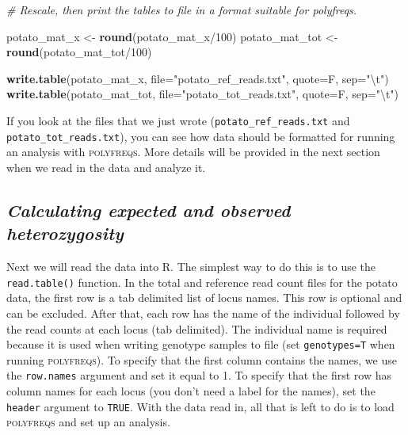 \documentclass[]{article}
\newenvironment{Shaded}{\begin{snugshade}}{\end{snugshade}}
\newcommand{\KeywordTok}[1]{\textcolor[rgb]{0.13,0.29,0.53}{\textbf{{#1}}}}
\newcommand{\DataTypeTok}[1]{\textcolor[rgb]{0.13,0.29,0.53}{{#1}}}
\newcommand{\DecValTok}[1]{\textcolor[rgb]{0.00,0.00,0.81}{{#1}}}
\newcommand{\CharTok}[1]{\textcolor[rgb]{0.31,0.60,0.02}{{#1}}}
\newcommand{\StringTok}[1]{\textcolor[rgb]{0.31,0.60,0.02}{{#1}}}
\newcommand{\CommentTok}[1]{\textcolor[rgb]{0.56,0.35,0.01}{\textit{{#1}}}}
\newcommand{\NormalTok}[1]{{#1}}
\begin{document}
\begin{Shaded}
\begin{Highlighting}[]
\CommentTok{# Rescale, then print the tables to file in a format suitable for polyfreqs.}

\NormalTok{potato_mat_x <-}\StringTok{ }\KeywordTok{round}\NormalTok{(potato_mat_x/}\DecValTok{100}\NormalTok{)}
\NormalTok{potato_mat_tot <-}\StringTok{ }\KeywordTok{round}\NormalTok{(potato_mat_tot/}\DecValTok{100}\NormalTok{)}

\KeywordTok{write.table}\NormalTok{(potato_mat_x, }\DataTypeTok{file=}\StringTok{"potato_ref_reads.txt"}\NormalTok{, }\DataTypeTok{quote=}\NormalTok{F, }\DataTypeTok{sep=}\StringTok{"}\CharTok{\textbackslash{}t}\StringTok{"}\NormalTok{)}
\KeywordTok{write.table}\NormalTok{(potato_mat_tot, }\DataTypeTok{file=}\StringTok{"potato_tot_reads.txt"}\NormalTok{, }\DataTypeTok{quote=}\NormalTok{F, }\DataTypeTok{sep=}\StringTok{"}\CharTok{\textbackslash{}t}\StringTok{"}\NormalTok{)}
\end{Highlighting}
\end{Shaded}

If you look at the files that we just wrote
(\texttt{potato\_ref\_reads.txt} and \texttt{potato\_tot\_reads.txt}),
you can see how data should be formatted for running an analysis with
\textsc{polyfreqs}. More details will be provided in the next section
when we read in the data and analyze it.

\subsection{\texorpdfstring{\emph{Calculating expected and observed
heterozygosity}}{Calculating expected and observed heterozygosity}}\label{calculating-expected-and-observed-heterozygosity}

Next we will read the data into R. The simplest way to do this is to use
the \texttt{read.table()} function. In the total and reference read
count files for the potato data, the first row is a tab delimited list
of locus names. This row is optional and can be excluded. After that,
each row has the name of the individual followed by the read counts at
each locus (tab delimited). The individual name is required because it
is used when writing genotype samples to file (set \texttt{genotypes=T}
when running \textsc{polyfreqs}). To specify that the first column
contains the names, we use the \texttt{row.names} argument and set it
equal to 1. To specify that the first row has column names for each
locus (you don't need a label for the names), set the \texttt{header}
argument to \texttt{TRUE}. With the data read in, all that is left to do
is to load \textsc{polyfreqs} and set up an analysis.
\end{document}
